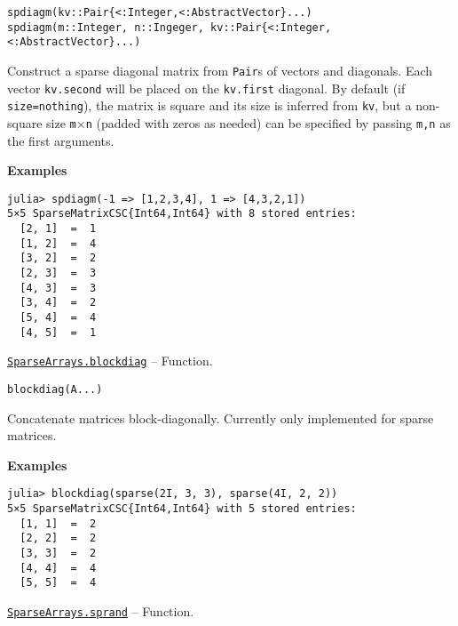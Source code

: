 \begin{adjustwidth}{2em}{0pt}


\begin{verbatim}
spdiagm(kv::Pair{<:Integer,<:AbstractVector}...)
spdiagm(m::Integer, n::Ingeger, kv::Pair{<:Integer,<:AbstractVector}...)
\end{verbatim}

Construct a sparse diagonal matrix from \texttt{Pair}s of vectors and diagonals. Each vector \texttt{kv.second} will be placed on the \texttt{kv.first} diagonal.  By default (if \texttt{size=nothing}), the matrix is square and its size is inferred from \texttt{kv}, but a non-square size \texttt{m}×\texttt{n} (padded with zeros as needed) can be specified by passing \texttt{m,n} as the first arguments.

\textbf{Examples}


\begin{verbatim}
julia> spdiagm(-1 => [1,2,3,4], 1 => [4,3,2,1])
5×5 SparseMatrixCSC{Int64,Int64} with 8 stored entries:
  [2, 1]  =  1
  [1, 2]  =  4
  [3, 2]  =  2
  [2, 3]  =  3
  [4, 3]  =  3
  [3, 4]  =  2
  [5, 4]  =  4
  [4, 5]  =  1
\end{verbatim}



\end{adjustwidth}
\hypertarget{12222128005156653307}{} 
\hyperlink{12222128005156653307}{\texttt{SparseArrays.blockdiag}}  -- {Function.}

\begin{adjustwidth}{2em}{0pt}


\begin{verbatim}
blockdiag(A...)
\end{verbatim}

Concatenate matrices block-diagonally. Currently only implemented for sparse matrices.

\textbf{Examples}


\begin{verbatim}
julia> blockdiag(sparse(2I, 3, 3), sparse(4I, 2, 2))
5×5 SparseMatrixCSC{Int64,Int64} with 5 stored entries:
  [1, 1]  =  2
  [2, 2]  =  2
  [3, 3]  =  2
  [4, 4]  =  4
  [5, 5]  =  4
\end{verbatim}



\end{adjustwidth}
\hypertarget{10437881912081266792}{} 
\hyperlink{10437881912081266792}{\texttt{SparseArrays.sprand}}  -- {Function.}

